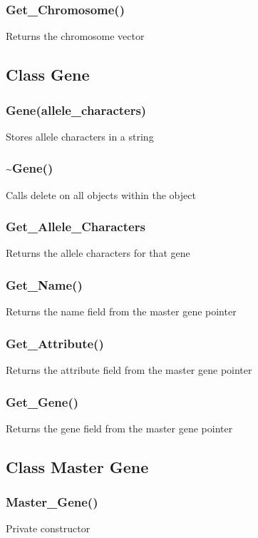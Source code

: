 \documentclass{article}
\begin{document}
\subsubsection{Get\_Chromosome()}
\indent Returns the chromosome vector

\newpage
\subsection{Class Gene}
\subsubsection{Gene(allele\_characters)}
\indent Stores allele characters in a string\\

\subsubsection{\textasciitilde Gene()}
\indent Calls delete on all objects within the object

\subsubsection{Get\_Allele\_Characters}
\indent Returns the allele characters for that gene

\subsubsection{Get\_Name()}
\indent Returns the name field from the master gene pointer

\subsubsection{Get\_Attribute()}
\indent Returns the attribute field from the master gene pointer

\subsubsection{Get\_Gene()}
\indent Returns the gene field from the master gene pointer

\newpage
\subsection{Class Master Gene}

\subsubsection{Master\_Gene()}
\indent Private constructor
\end{document}
